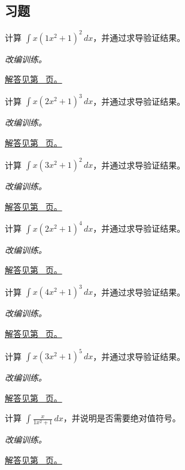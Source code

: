 \documentclass[UTF8,12pt,a4paper,fontset=fandol]{ctexart}
\begin{document}
\subsection{习题}
\begin{example}[识别幂函数的内层导数]\label{ex:c12q1}
计算 $\displaystyle\int x(1x^2+1)^{2}\,dx$，并通过求导验证结果。
\par\textit{改编训练。}\par\hyperref[ans:c12q1]{解答见第~\pageref{ans:c12q1} 页。}
\end{example}
\begin{example}[识别幂函数的内层导数]\label{ex:c12q2}
计算 $\displaystyle\int x(2x^2+1)^{3}\,dx$，并通过求导验证结果。
\par\textit{改编训练。}\par\hyperref[ans:c12q2]{解答见第~\pageref{ans:c12q2} 页。}
\end{example}
\begin{example}[识别幂函数的内层导数]\label{ex:c12q3}
计算 $\displaystyle\int x(3x^2+1)^{2}\,dx$，并通过求导验证结果。
\par\textit{改编训练。}\par\hyperref[ans:c12q3]{解答见第~\pageref{ans:c12q3} 页。}
\end{example}
\begin{example}[识别幂函数的内层导数]\label{ex:c12q4}
计算 $\displaystyle\int x(2x^2+1)^{4}\,dx$，并通过求导验证结果。
\par\textit{改编训练。}\par\hyperref[ans:c12q4]{解答见第~\pageref{ans:c12q4} 页。}
\end{example}
\begin{example}[识别幂函数的内层导数]\label{ex:c12q5}
计算 $\displaystyle\int x(4x^2+1)^{3}\,dx$，并通过求导验证结果。
\par\textit{改编训练。}\par\hyperref[ans:c12q5]{解答见第~\pageref{ans:c12q5} 页。}
\end{example}
\begin{example}[识别幂函数的内层导数]\label{ex:c12q6}
计算 $\displaystyle\int x(3x^2+1)^{5}\,dx$，并通过求导验证结果。
\par\textit{改编训练。}\par\hyperref[ans:c12q6]{解答见第~\pageref{ans:c12q6} 页。}
\end{example}
\begin{example}[分母导数型积分]\label{ex:c12q7}
计算 $\displaystyle\int\frac{x}{1x^2+1}\,dx$，并说明是否需要绝对值符号。
\par\textit{改编训练。}\par\hyperref[ans:c12q7]{解答见第~\pageref{ans:c12q7} 页。}
\end{example}
\end{document}
